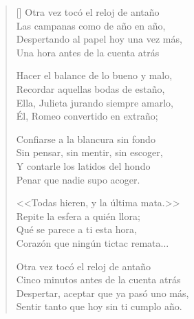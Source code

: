 \documentclass[a4paper,11pt]{letter}
\begin{document}

\settowidth{\versewidth}{Sentir tanto que hoy sin ti cumplo año.}

\bigskip

\begin{verse}[\versewidth]
Otra vez tocó el reloj de antaño \\
Las campanas como de año en año, \\
Despertando al papel hoy una vez más, \\
Una hora antes de la cuenta atrás

Hacer el balance de lo bueno y malo, \\
Recordar aquellas bodas de estaño, \\
Ella, Julieta jurando siempre amarlo, \\
Él, Romeo convertido en extraño;

Confiarse a la blancura sin fondo \\
Sin pensar, sin mentir, sin escoger, \\
Y contarle los latidos del hondo \\
Penar que nadie supo acoger.

<<Todas hieren, y la última mata.>> \\
Repite la esfera a quién llora; \\
Qué se parece a ti esta hora, \\
Corazón que ningún tictac remata...

Otra vez tocó el reloj de antaño \\
Cinco minutos antes de la cuenta atrás \\
Despertar, aceptar que ya pasó uno más, \\
Sentir tanto que hoy sin ti cumplo año.
\end{verse}
\end{document}
